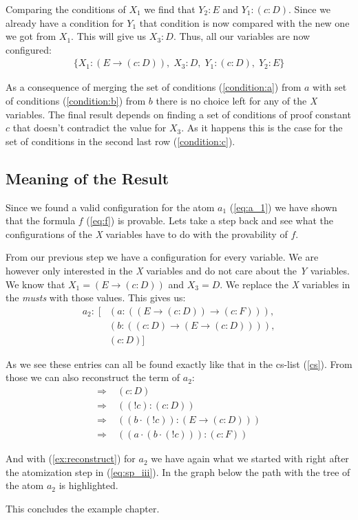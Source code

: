 Comparing the conditions of $X_1$ we find that $Y_2: E$ and $Y_1: (c:D)$. Since we already have a condition for $Y_1$ that condition is now compared with the new one we got from $X_1$. This will give us $X_3: D$. Thus, all our variables are now configured:
\begin{align}
	\{X_1: (E \rightarrow (c:D)), \; X_3: D, \; Y_1: (c:D), \; Y_2: E\}
\end{align}

As a consequence of merging the set of conditions (\ref{condition:a}) from $a$ with set of conditions (\ref{condition:b}) from $b$ there is no choice left for any of the \emph{X} variables. The final result depends on finding a set of conditions of proof constant $c$ that doesn't contradict the value for $X_3$. As it happens this is the case for the set of conditions in the second last row (\ref{condition:c}).

\subsection{Meaning of the Result}
Since we found a valid configuration for the atom $a_1$ (\ref{eq:a_1}) we have shown that the formula $f$ (\ref{eq:f}) is provable. Lets take a step back and see what the configurations of the \emph{X} variables have to do with the provability of $f$.

From our previous step we have a configuration for every variable. We are however only interested in the \emph{X} variables and do not care about the \emph{Y} variables. We know that $X_1 = (E \rightarrow (c:D))$ and $X_3 = D$. We replace the \emph{X} variables in the \emph{musts} with those values. This gives us:
\begin{equation}
\begin{split}
	a_2: \; [&(a: ((E \rightarrow (c:D)) \rightarrow (c:F))), \\
	&(b: ((c:D) \rightarrow (E \rightarrow (c:D)))), \\
	&(c: D)]
\end{split}
\end{equation}

As we see these entries can all be found exactly like that in the cs-list (\ref{cs}). From those we can also reconstruct the term of $a_2$: 
\begin{align}
	\Rightarrow & \; (c:D) \\
	\Rightarrow & \; ((!c):(c:D)) \\
	\Rightarrow & \; ((b\cdot(!c)):(E \rightarrow (c:D)))\\
	\Rightarrow & \; ((a\cdot(b\cdot(!c))):(c:F)) \label{ex:reconstruct}
\end{align}

And with (\ref{ex:reconstruct}) for $a_2$ we have again what we started with right after the atomization step in (\ref{eq:sp_iii}). In the graph below the path with the tree of the atom $a_2$ is highlighted. 


This concludes the example chapter. 